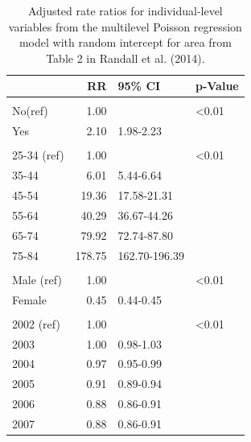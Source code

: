 \documentclass[
]{krantz}
\begin{document}
\begin{table}

\caption{\label{tab:table4chp11}Adjusted rate ratios for individual-level variables from the multilevel Poisson regression model with random intercept for area from Table 2 in Randall et al. (2014).}
\centering
\begin{tabular}[t]{lrll}
\toprule
  & RR & 95\% CI & p-Value\\
\midrule
\addlinespace[0.3em]
\multicolumn{4}{l}{\textbf{Aboriginal}}\\
\hspace{1em}No(ref) & 1.00 &  & <0.01\\
\hspace{1em}Yes & 2.10 & 1.98-2.23 & \\
\addlinespace[0.3em]
\multicolumn{4}{l}{\textbf{Age Group}}\\
\hspace{1em}25-34 (ref) & 1.00 &  & <0.01\\
\hspace{1em}35-44 & 6.01 & 5.44-6.64 & \\
\hspace{1em}45-54 & 19.36 & 17.58-21.31 & \\
\hspace{1em}55-64 & 40.29 & 36.67-44.26 & \\
\hspace{1em}65-74 & 79.92 & 72.74-87.80 & \\
\hspace{1em}75-84 & 178.75 & 162.70-196.39 & \\
\addlinespace[0.3em]
\multicolumn{4}{l}{\textbf{Sex}}\\
\hspace{1em}Male (ref) & 1.00 &  & <0.01\\
\hspace{1em}Female & 0.45 & 0.44-0.45 & \\
\addlinespace[0.3em]
\multicolumn{4}{l}{\textbf{Year}}\\
\hspace{1em}2002 (ref) & 1.00 &  & <0.01\\
\hspace{1em}2003 & 1.00 & 0.98-1.03 & \\
\hspace{1em}2004 & 0.97 & 0.95-0.99 & \\
\hspace{1em}2005 & 0.91 & 0.89-0.94 & \\
\hspace{1em}2006 & 0.88 & 0.86-0.91 & \\
\hspace{1em}2007 & 0.88 & 0.86-0.91 & \\
\bottomrule
\end{tabular}
\end{table}
\end{document}
